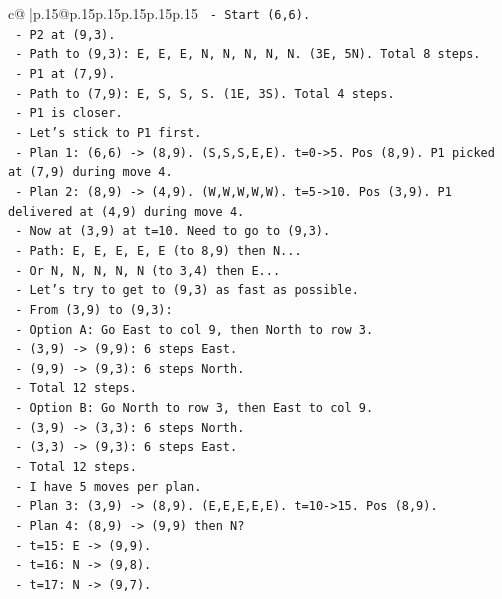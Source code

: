 \documentclass{article}
\begin{document}
{\begin{supertabular}{c@{$\;$}|p{.15\linewidth}@{}p{.15\linewidth}p{.15\linewidth}p{.15\linewidth}p{.15\linewidth}p{.15\linewidth}}
{{{\texttt{  {-} Start (6,6).} \\
\texttt{  {-} P2 at (9,3).} \\
\texttt{  {-} Path to (9,3): E, E, E, N, N, N, N, N. (3E, 5N). Total 8 steps.} \\
\texttt{  {-} P1 at (7,9).} \\
\texttt{  {-} Path to (7,9): E, S, S, S. (1E, 3S). Total 4 steps.} \\
\texttt{  {-} P1 is closer.} \\
\texttt{  {-} Let's stick to P1 first.} \\
\texttt{  {-} Plan 1: (6,6) {-}> (8,9). (S,S,S,E,E). t=0{-}>5. Pos (8,9). P1 picked at (7,9) during move 4.} \\
\texttt{  {-} Plan 2: (8,9) {-}> (4,9). (W,W,W,W,W). t=5{-}>10. Pos (3,9). P1 delivered at (4,9) during move 4.} \\
\texttt{  {-} Now at (3,9) at t=10. Need to go to (9,3).} \\
\texttt{  {-} Path: E, E, E, E, E (to 8,9) then N...} \\
\texttt{  {-} Or N, N, N, N, N (to 3,4) then E...} \\
\texttt{  {-} Let's try to get to (9,3) as fast as possible.} \\
\texttt{  {-} From (3,9) to (9,3):} \\
\texttt{    {-} Option A: Go East to col 9, then North to row 3.} \\
\texttt{      {-} (3,9) {-}> (9,9): 6 steps East.} \\
\texttt{      {-} (9,9) {-}> (9,3): 6 steps North.} \\
\texttt{      {-} Total 12 steps.} \\
\texttt{    {-} Option B: Go North to row 3, then East to col 9.} \\
\texttt{      {-} (3,9) {-}> (3,3): 6 steps North.} \\
\texttt{      {-} (3,3) {-}> (9,3): 6 steps East.} \\
\texttt{      {-} Total 12 steps.} \\
\texttt{  {-} I have 5 moves per plan.} \\
\texttt{  {-} Plan 3: (3,9) {-}> (8,9). (E,E,E,E,E). t=10{-}>15. Pos (8,9).} \\
\texttt{  {-} Plan 4: (8,9) {-}> (9,9) then N?} \\
\texttt{    {-} t=15: E {-}> (9,9).} \\
\texttt{    {-} t=16: N {-}> (9,8).} \\
\texttt{    {-} t=17: N {-}> (9,7).} \\
}}}
\end{supertabular}}
\end{document}

